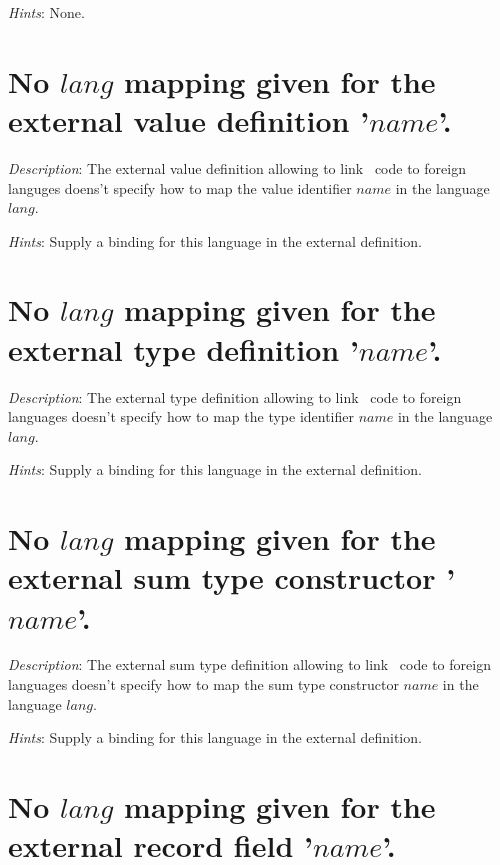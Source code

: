 {\em Hints}: None.



\section*{No $lang$ mapping given for the external value definition
  '$name$'.}

{\em Description}: The external value definition allowing to link
\focal\ code to foreign languges doens't specify how to map the value
identifier $name$ in the language $lang$.

{\em Hints}: Supply a binding for this language in the external
definition.



\section*{No $lang$ mapping given for the external type definition
  '$name$'.}

{\em Description}: The external type definition allowing to link
\focal\ code to foreign languages doesn't specify how to map the type
identifier $name$ in the language $lang$.

{\em Hints}: Supply a binding for this language in the external
definition.



\section*{No $lang$ mapping given for the external sum type
  constructor '$name$'.}

{\em Description}: The external sum type definition allowing to link
\focal\ code to foreign languages doesn't specify how to map the sum
type constructor $name$ in the language $lang$.

{\em Hints}: Supply a binding for this language in the external
definition.



\section*{No $lang$ mapping given for the external record field
  '$name$'.}

